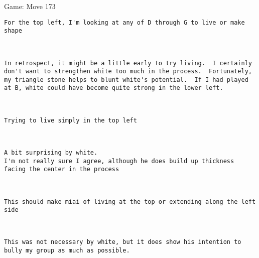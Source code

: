 \documentclass{article}
\begin{document}
\begin{section}{Game: Move 173}
\begin{center}
\begin{lstlisting}
For the top left, I'm looking at any of D through G to live or make shape\end{lstlisting}
\end{center}
\begin{center}
\cleargoban
{}
\showfullgoban
\\\begin{lstlisting}
In retrospect, it might be a little early to try living.  I certainly don't want to strengthen white too much in the process.  Fortunately, my triangle stone helps to blunt white's potential.  If I had played at B, white could have become quite strong in the lower left.\end{lstlisting}
\end{center}
\begin{center}
\cleargoban
{}
\showfullgoban
\\\begin{lstlisting}
Trying to live simply in the top left\end{lstlisting}
\end{center}
\begin{center}
\cleargoban
{}
\showfullgoban
\\\begin{lstlisting}
A bit surprising by white.
I'm not really sure I agree, although he does build up thickness facing the center in the process\end{lstlisting}
\end{center}
\begin{center}
\cleargoban
{}
\showfullgoban
\\\begin{lstlisting}
This should make miai of living at the top or extending along the left side\end{lstlisting}
\end{center}
\begin{center}
\cleargoban
{}
\showfullgoban
\\\begin{lstlisting}
This was not necessary by white, but it does show his intention to bully my group as much as possible.


\end{lstlisting}
\end{center}
\end{section}
\end{document}
